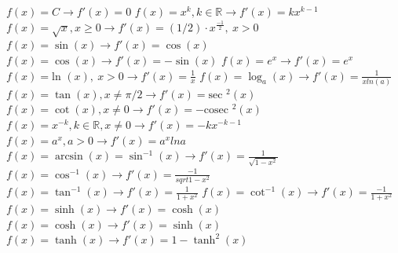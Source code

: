 \documentclass[12pt]{article}
\def\cosec{\text{cosec\ }} %
\def\sec{\text{sec\ }} %
\def\ln{\text{ln\ }} %
\begin{document}
\begin{flushleft}
	\textbullet \quad $\displaystyle f(x) = C \rightarrow f'(x) = 0 $ \linebreak 
	\textbullet \quad $\displaystyle f(x) = x^k, k \in \mathbb{R} \rightarrow f'(x) = kx^{k-1} $ \linebreak 
	\textbullet \quad $\displaystyle f(x) = \sqrt{x}, x\geq 0 \rightarrow f'(x) = (1/2) \cdot x^{\frac{-1}{2}}, \ x> 0 $ \linebreak 
	\textbullet \quad $\displaystyle f(x) = \sin (x) \rightarrow f'(x) = \cos (x) $ \linebreak 
	\textbullet \quad $\displaystyle f(x) = \cos (x) \rightarrow f'(x) = -\sin (x)$ \linebreak 
	\textbullet \quad $\displaystyle f(x) = e^x \rightarrow f'(x) = e^x $ \linebreak 
	\textbullet \quad $\displaystyle f(x) = \ln(x), \ x> 0 \rightarrow f'(x) = \frac{1}{x} $ \linebreak 
	\textbullet \quad $\displaystyle f(x) = \log_a(x) \rightarrow f'(x) = \frac{1}{xln(a)} $ \linebreak 
	\textbullet \quad $\displaystyle f(x) = \tan (x) , x\neq \pi / 2 \rightarrow f'(x) = \sec ^2 (x) $ \linebreak 
	\textbullet \quad $\displaystyle f(x) = \cot (x), x\neq 0 \rightarrow f'(x) = -\cosec ^2(x) $ \linebreak 
	\textbullet \quad $\displaystyle f(x) = x^{-k}, k \in \mathbb{R}, x\neq 0 \rightarrow f'(x) = -kx^{-k-1} $ \linebreak 
	\textbullet \quad $\displaystyle f(x) = a^x, a> 0 \rightarrow f'(x) = a^x lna $ \linebreak 
	\textbullet \quad $\displaystyle f(x) = \arcsin (x) = \sin ^{-1}(x) \rightarrow f'(x) = \frac{1}{\sqrt{1-x^2}} $ \linebreak 
	\textbullet \quad $\displaystyle f(x) = \cos ^{-1} (x) \rightarrow f'(x) = \frac{-1}{sqrt{1-x^2}} $ \linebreak 
	\textbullet \quad $\displaystyle f(x) = \tan^{-1}(x) \rightarrow f'(x) = \frac{1}{1+x^2} $ \linebreak 
	\textbullet \quad $\displaystyle f(x) = \cot ^{-1} (x) \rightarrow f'(x) = \frac{-1}{1+x^2} $ \linebreak 
	\textbullet \quad $\displaystyle f(x) = \sinh (x) \rightarrow f'(x) = \cosh (x) $ \linebreak 
	\textbullet \quad $\displaystyle f(x) = \cosh (x) \rightarrow f'(x) = \sinh (x) $ \linebreak 
	\textbullet \quad $\displaystyle f(x) = \tanh (x) \rightarrow f'(x) = 1-\tanh ^2(x) $ \linebreak 

\end{flushleft}
\end{document}
